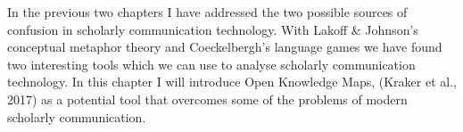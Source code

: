 In the previous two chapters I have addressed the two possible sources of confusion in scholarly communication technology. With Lakoff & Johnson’s conceptual metaphor theory and Coeckelbergh’s language games we have found two interesting tools which we can use to analyse scholarly communication technology. In this chapter I will introduce Open Knowledge Maps,  (Kraker et al., 2017) as a potential tool that overcomes some of the problems of modern scholarly communication.